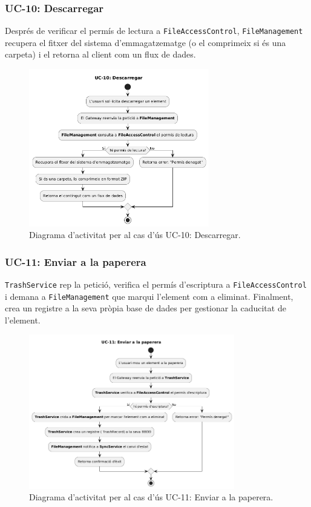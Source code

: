 \subsubsection{UC-10: Descarregar}
Després de verificar el permís de lectura a \texttt{FileAccessControl}, \texttt{FileManagement} recupera el fitxer del sistema d'emmagatzematge (o el comprimeix si és una carpeta) i el retorna al client com un flux de dades.

\begin{figure}[H]
    \centering
    \includegraphics[width=0.7\textwidth]{Figures/ad_UC10.png}
    \caption{Diagrama d'activitat per al cas d'ús UC-10: Descarregar.}
    \label{fig:ad_uc10_app}
\end{figure}

\subsubsection{UC-11: Enviar a la paperera}
\texttt{TrashService} rep la petició, verifica el permís d'escriptura a \texttt{FileAccessControl} i demana a \texttt{FileManagement} que marqui l'element com a eliminat. Finalment, crea un registre a la seva pròpia base de dades per gestionar la caducitat de l'element.

\begin{figure}[H]
    \centering
    \includegraphics[width=0.8\textwidth]{Figures/ad_UC11.png}
    \caption{Diagrama d'activitat per al cas d'ús UC-11: Enviar a la paperera.}
    \label{fig:ad_uc11_app}
\end{figure}

